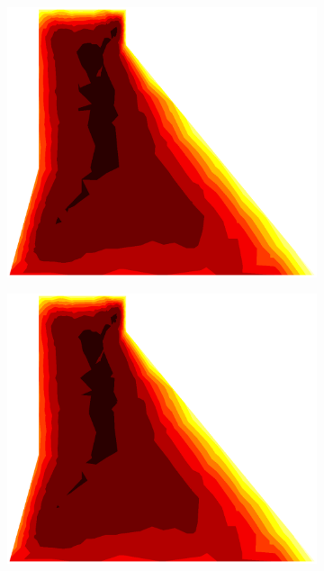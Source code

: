 \documentclass[10pt, a4paper]{article}
\begin{document}
\begin{figure}[H]
\begin{subfigure}[H]{0.19\textwidth}
		\includegraphics[width=1.2\textwidth]{fig/30.eps}
	\end{subfigure}
	\begin{subfigure}[H]{0.19\textwidth}
		\includegraphics[width=1.2\textwidth]{fig/31.eps}
	\end{subfigure}
	\begin{subfigure}[H]{0.19\textwidth}

\end{subfigure}
\end{figure}
\end{document}
